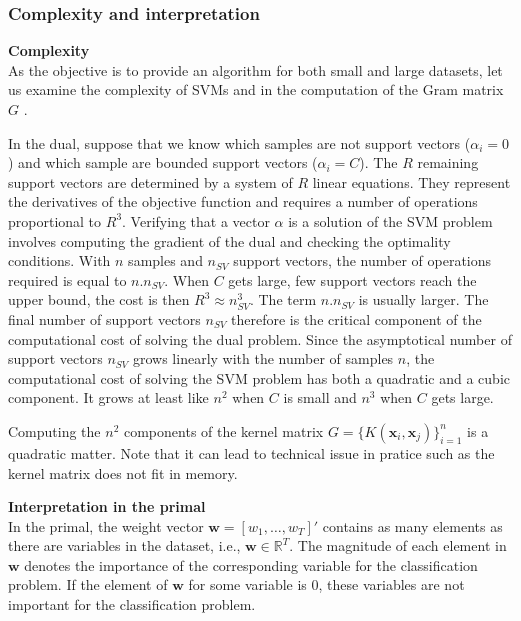 \subsubsection{Complexity and interpretation}
\label{subsec:interpretation}

\noindent \textbf{Complexity} \\
As the objective is to provide an algorithm for both small and large datasets, let us examine the complexity of SVMs and in the computation of the Gram matrix $G$ \cite{Bottou2007}.

In the dual, suppose that we know which samples are not support vectors ($\alpha_i = 0$) and which sample are bounded support vectors ($\alpha_i = C$). The $R$ remaining support vectors are determined by a system of $R$ linear equations. They represent the derivatives of the objective function and requires a number of operations proportional to $R^3$. Verifying that a vector $\alpha$ is a solution of the SVM problem involves computing the gradient of the dual and checking the optimality conditions. With $n$ samples and $n_{SV}$ support vectors, the number of operations required is equal to $n.n_{SV}$. When $C$ gets large, few support vectors reach the upper bound, the cost is then $R^3 \approx n_{SV}^3$. The term $n.n_{SV}$ is usually larger. The final number of support vectors $n_{SV}$ therefore is the critical component of the computational cost of solving the dual problem. Since the asymptotical number of support vectors $n_{SV}$ grows linearly with the number of samples $n$, the computational cost of solving the SVM problem has both a quadratic and a cubic component. It grows at least like $n^2$ when $C$ is small and $n^3$ when $C$ gets large.

Computing the $n^2$ components of the kernel matrix $G = \{K(\textbf{x}_i
, \textbf{x}_j)\}_{i=1}^n$ is a quadratic matter. Note that it can lead to technical issue in pratice such as the kernel matrix does not fit in memory.


\noindent \textbf{Interpretation in the primal} \\
In the primal, the weight vector $\textbf{w} = [w_1, \ldots, w_T]'$ contains as many elements as there are variables in the dataset, i.e., $\textbf{w} \in \mathbb{R}^T$. The magnitude of each element in $\textbf{w}$ denotes the importance of the corresponding variable for the classification problem. If the element of $\textbf{w}$ for some variable is 0, these variables are not important for the classification problem.


